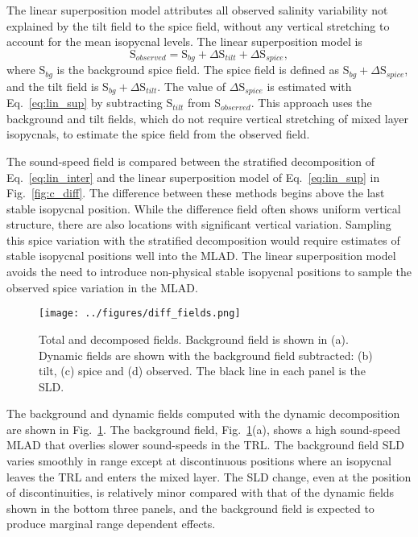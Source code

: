 \documentclass[preprint,NumberedRefs]{JASA}
\begin{document}
The linear superposition model attributes all observed salinity variability not explained by the tilt field to the spice field, without any vertical stretching to account for the mean isopycnal levels. The linear superposition model is
\begin{equation}
    \textrm{S}_{observed} = \textrm{S}_{bg} + \Delta \textrm{S}_{tilt} + \Delta \textrm{S}_{spice},
    \label{eq:lin_sup}
\end{equation}
where S$_{bg}$ is the background spice field. The spice field is defined as S$_{bg} + \Delta \textrm{S}_{spice}$, and the tilt field is S$_{bg} + \Delta \textrm{S}_{tilt}$. The value of $\Delta \textrm{S}_{spice}$ is estimated with Eq.~\eqref{eq:lin_sup} by subtracting S$_{tilt}$ from S$_{observed}$. This approach uses the background and tilt fields, which do not require vertical stretching of mixed layer isopycnals, to estimate the spice field from the observed field.

The sound-speed field is compared between the stratified decomposition of Eq.~\eqref{eq:lin_inter} and the linear superposition model of Eq.~\eqref{eq:lin_sup} in Fig.~\ref{fig:c_diff}. The difference between these methods begins above the last stable isopycnal position. While the difference field often shows uniform vertical structure, there are also locations with significant vertical variation. Sampling this spice variation with the stratified decomposition would require estimates of stable isopycnal positions well into the MLAD. The linear superposition model avoids the need to introduce non-physical stable isopycnal positions to sample the observed spice variation in the MLAD.

\begin{figure}
\texttt{[image: ../figures/diff\_fields.png]}
        \caption{\label{fig:c_fields}{Total and decomposed fields. Background field is shown in (a). Dynamic fields are shown with the background field subtracted: (b) tilt, (c) spice and (d) observed. The black line in each panel is the SLD.}}
\end{figure}

The background and dynamic fields computed with the dynamic decomposition are shown in Fig.~\ref{fig:c_fields}. The background field, Fig.~\ref{fig:c_fields}(a), shows a high sound-speed MLAD that overlies slower sound-speeds in the TRL. The background field SLD varies smoothly in range except at discontinuous positions where an isopycnal leaves the TRL and enters the mixed layer. The SLD change, even at the position of discontinuities, is relatively minor compared with that of the dynamic fields shown in the bottom three panels, and the background field is expected to produce marginal range dependent effects.
\end{document}
